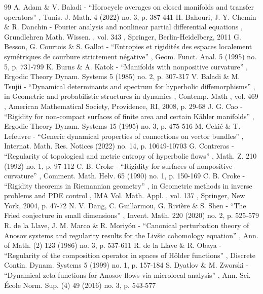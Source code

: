 \begin{thebibliography}{99}
 A. Adam \& V. Baladi - “Horocycle averages on closed manifolds and transfer operators” , Tunis. J. Math. 4 (2022) no. 3, p. 387-441
 H. Bahouri, J.-Y. Chemin \& R. Danchin - Fourier analysis and nonlinear partial differential equations , Grundlehren Math. Wissen. , vol. 343 , Springer, Berlin-Heidelberg, 2011
 G. Besson, G. Courtois \& S. Gallot - “Entropies et rigidités des espaces localement symétriques de courbure strictement négative” , Geom. Funct. Anal. 5 (1995) no. 5, p. 731-799
 K. Burns \& A. Katok - “Manifolds with nonpositive curvature” , Ergodic Theory Dynam. Systems 5 (1985) no. 2, p. 307-317
 V. Baladi \& M. Tsujii - “Dynamical determinants and spectrum for hyperbolic diffemorphisms” , in Geometric and probabilistic structures in dynamics , Contemp. Math , vol. 469 , American Mathematical Society, Providence, RI, 2008, p. 29-68
 J. G. Cao - “Rigidity for non-compact surfaces of finite area and certain Kähler manifolds” , Ergodic Theory Dynam. Systems 15 (1995) no. 3, p. 475-516
 M. Cekić \& T. Lefeuvre - “Generic dynamical properties of connections on vector bundles” , Internat. Math. Res. Notices (2022) no. 14, p. 10649-10703
 G. Contreras - “Regularity of topological and metric entropy of hyperbolic flows” , Math. Z. 210 (1992) no. 1, p. 97-112
 C. B. Croke - “Rigidity for surfaces of nonpositive curvature” , Comment. Math. Helv. 65 (1990) no. 1, p. 150-169
 C. B. Croke - “Rigidity theorems in Riemannian geometry” , in Geometric methods in inverse problems and PDE control , IMA Vol. Math. Appl. , vol. 137 , Springer, New York, 2004, p. 47-72
 N. V. Dang, C. Guillarmou, G. Rivière \& S. Shen - “The Fried conjecture in small dimensions” , Invent. Math. 220 (2020) no. 2, p. 525-579
 R. de la Llave, J. M. Marco \& R. Moriyón - “Canonical perturbation theory of Anosov systems and regularity results for the Livšic cohomology equation” , Ann. of Math. (2) 123 (1986) no. 3, p. 537-611
 R. de la Llave \& R. Obaya - “Regularity of the composition operator in spaces of Hölder functions” , Discrete Contin. Dynam. Systems 5 (1999) no. 1, p. 157-184
 S. Dyatlov \& M. Zworski - “Dynamical zeta functions for Anosov flows via microlocal analysis” , Ann. Sci. École Norm. Sup. (4) 49 (2016) no. 3, p. 543-577

\end{thebibliography}
